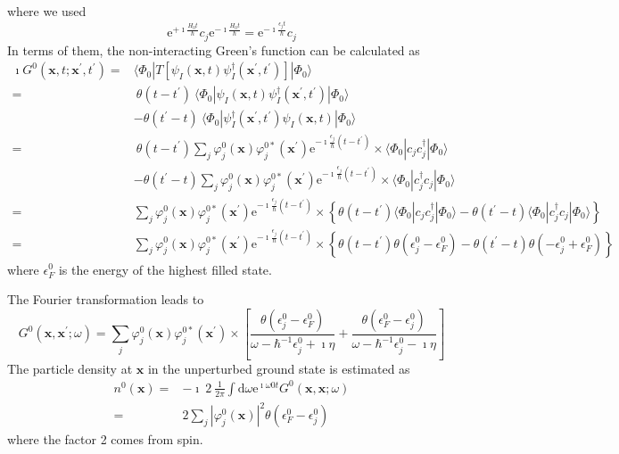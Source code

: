 where we used \[\mathrm{e}^{+\imath\frac{H_{0}t}{\hbar}}c_{j}\mathrm{e}^{-\imath\frac{H_{0}t}{\hbar}}=\mathrm{e}^{-\imath\frac{\epsilon_{j}t}{\hbar}}c_{j}\]
In terms of them, the non-interacting Green's function can be calculated as
\[ \begin{split}
\imath G^{0}(\mathbf{x},t;\mathbf{x}^{'},t^{'})=& \langle \Phi_{0} | T [ \psi_{I}(\mathbf{x},t) \psi_{I}^{\dagger}(\mathbf{x}^{'},t^{'}) ] | \Phi_{0} \rangle\\
=& \  \theta(t-t^{'}) \  \langle \Phi_{0} | \psi_{I}(\mathbf{x},t) \psi_{I}^{\dagger}(\mathbf{x}^{'},t^{'}) | \Phi_{0} \rangle \\
&-\theta(t^{'}-t) \  \langle \Phi_{0} | \psi_{I}^{\dagger}(\mathbf{x}^{'},t^{'}) \psi_{I}(\mathbf{x},t) | \Phi_{0} \rangle \\
=& \ \theta(t-t^{'}) \sum_{j} \varphi_{j}^{0}(\mathbf{x})\varphi_{j}^{0*}(\mathbf{x}^{'}) \mathrm{e}^{-\imath\frac{\epsilon_{j}}{\hbar}(t-t^{'})}
\times \langle \Phi_{0} | c_{j}c_{j}^{\dagger} | \Phi_{0} \rangle \\
&-\theta(t^{'}-t) \sum_{j} \varphi_{j}^{0}(\mathbf{x})\varphi_{j}^{0*}(\mathbf{x}^{'}) \mathrm{e}^{-\imath\frac{\epsilon_{j}}{\hbar}(t-t^{'})}
\times \langle \Phi_{0} | c_{j}^{\dagger}c_{j} | \Phi_{0} \rangle\\
=&\sum_{j} \varphi_{j}^{0}(\mathbf{x})\varphi_{j}^{0*}(\mathbf{x}^{'}) \mathrm{e}^{-\imath\frac{\epsilon_{j}}{\hbar}(t-t^{'})} \times \left \{ \theta(t-t^{'})\langle \Phi_{0} | c_{j}c_{j}^{\dagger} | \Phi_{0} \rangle
-\theta(t^{'}-t)\langle \Phi_{0} | c_{j}^{\dagger}c_{j} | \Phi_{0} \rangle \right \}\\
=& \sum_{j} \varphi_{j}^{0}(\mathbf{x})\varphi_{j}^{0*}(\mathbf{x}^{'}) \mathrm{e}^{-\imath\frac{\epsilon_{j}}{\hbar}(t-t^{'})} \times \left \{ \theta(t-t^{'})\theta(\epsilon_{j}^{0}-\epsilon_{F}^{0}) - \theta(t^{'}-t)\theta(-\epsilon_{j}^{0}+\epsilon_{F}^{0}) \right \}
\end{split} \]
where $\epsilon_{F}^{0}$ is the energy of the highest filled state.

The Fourier transformation leads to
\begin{equation}\label{Eqs2.6.3}
G^{0}(\mathbf{x},\mathbf{x}^{'};\omega) = \sum_{j} \varphi_{j}^{0}(\mathbf{x})\varphi_{j}^{0*}(\mathbf{x}^{'}) \times \left[
\frac{\theta(\epsilon_{j}^{0}-\epsilon_{F}^{0})}{\omega-\hbar^{-1}\epsilon_{j}^{0}+\imath\eta} +\frac{\theta(\epsilon_{F}^{0}-\epsilon_{j}^{0})}{\omega-\hbar^{-1}\epsilon_{j}^{0}-\imath\eta}
 \right]
\end{equation}
The particle density at $\mathbf{x}$ in the unperturbed ground state is estimated as
\[ \begin{split} n^{0}(\mathbf{x}) =& -\imath \  2 \ \frac{1}{2\pi} \int \mathrm{d} \omega \mathrm{e}^{\imath\omega 0 t} G^{0}(\mathbf{x},\mathbf{x};\omega)\\
=& 2 \sum_{j} |\varphi_{j}^{0}(\mathbf{x})|^{2} \theta(\epsilon_{F}^{0}-\epsilon_{j}^{0})
\end{split}\]
where the factor 2 comes from spin.

